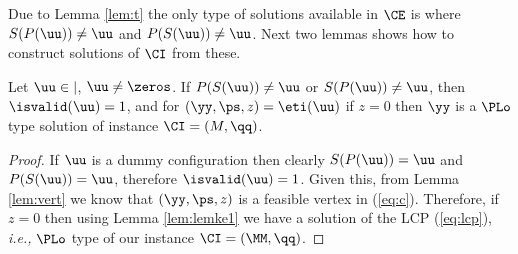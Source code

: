 Due to Lemma \ref{lem:t} the only type of solutions available in $\CE$ is where $S(P(\uu))\neq \uu$ and $P(S(\uu))\neq \uu$. Next two lemmas shows how to construct solutions of $\CI$ from these. 

\begin{lemma}\label{lem:t1}
Let $\uu \in \vert$, $\uu \neq \zeros$. %
If $P(S(\uu))\neq \uu$ or $S(P(\uu))\neq \uu$, then $\isvalid(\uu)=1$, and for $(\yy,\ps,z)=\eti(\uu)$ if $z=0$ then $\yy$ is a $\PLo$ type solution of \PLCP instance $\CI=(M,\qq)$. 
\end{lemma}
\begin{proof}
If $\uu$ is a dummy configuration then clearly $S(P(\uu))=\uu$ and $P(S(\uu))=\uu$, therefore $\isvalid(\uu)=1$. 
Given this, from Lemma \ref{lem:vert} we know that $(\yy,\ps,z)$ is a feasible vertex in (\ref{eq:c}). Therefore, if $z=0$ then using Lemma \ref{lem:lemke1} we have a solution of the LCP (\ref{eq:lcp}), {\em i.e.,} $\PLo$ type of our \PLCP instance $\CI=(\MM,\qq)$.
%
%
\end{proof}

